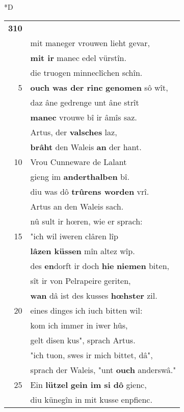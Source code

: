 \documentclass[8pt,a4paper,notitlepage]{article}
\begin{document}
\begin{table}[ht]
\begin{minipage}[t]{0.5\linewidth}
\small
\begin{center}*D
\end{center}
\begin{tabular}{rl}
\textbf{310} & \textbf{\begin{large}D\end{large}ô} kom vrou Gynover dar\\ 
 & mit maneger vrouwen lieht gevar,\\ 
 & \textbf{mit ir} manec edel vürstîn.\\ 
 & die truogen minneclîchen schîn.\\ 
5 & \textbf{ouch was der rinc} \textbf{genomen} sô wît,\\ 
 & daz âne gedrenge unt âne strît\\ 
 & \textbf{manec} vrouwe bî ir âmîs saz.\\ 
 & Artus, der \textbf{valsches} laz,\\ 
 & \textbf{brâht} den Waleis \textbf{an} der hant.\\ 
10 & Vrou Cunneware de Lalant\\ 
 & gieng im \textbf{anderthalben} bî.\\ 
 & diu was dô \textbf{trûrens worden} vrî.\\ 
 & Artus an den Waleis sach.\\ 
 & nû sult ir hœren, wie er sprach:\\ 
15 & "ich wil iweren clâren lîp\\ 
 & \textbf{lâzen küssen} mîn altez wîp.\\ 
 & des \textbf{en}dorft ir doch \textbf{hie} \textbf{niemen} biten,\\ 
 & sît ir von Pelrapeire geriten,\\ 
 & \textbf{wan} dâ ist des kusses \textbf{hœhster} zil.\\ 
20 & eines dinges ich iuch bitten wil:\\ 
 & kom ich immer in iwer hûs,\\ 
 & gelt disen kus", sprach Artus.\\ 
 & "ich tuon, swes ir mich bittet, dâ",\\ 
 & sprach der Waleis, "unt \textbf{ouch} anderswâ."\\ 
25 & Ein \textbf{lützel} \textbf{gein im si dô} gienc,\\ 
 & diu künegîn in mit kusse enpfienc.\\ 

\end{tabular}
\end{minipage}
\end{table}
\end{document}
